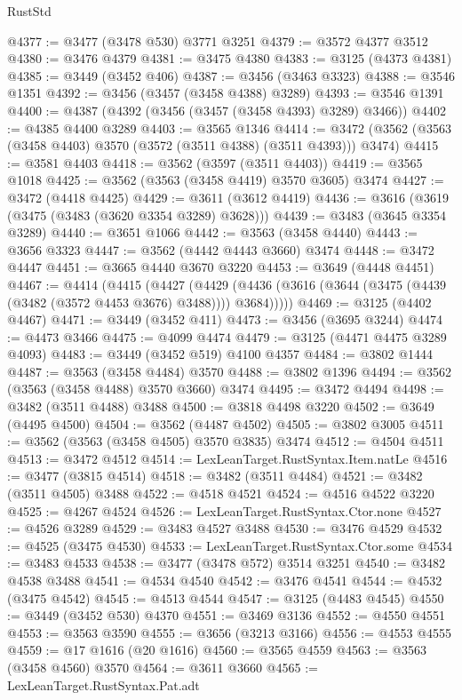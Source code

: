 \begin{lexlean}{RustStd}
\begin{coremodule}
{\begin{coremodule}
{{{{{{{{{{{{{{{{{{{{{{{{{{{{{{{{{{{{{{{{{{{{{@4377 := @3477 (@3478 @530) @3771 @3251
@4379 := @3572 @4377 @3512
@4380 := @3476 @4379
@4381 := @3475 @4380
@4383 := @3125 (@4373 @4381)
@4385 := @3449 (@3452 @406)
@4387 := @3456 (@3463 @3323)
@4388 := @3546 @1351
@4392 := @3456 (@3457 (@3458 @4388) @3289)
@4393 := @3546 @1391
@4400 := @4387 (@4392 (@3456 (@3457 (@3458 @4393) @3289) @3466))
@4402 := @4385 @4400 @3289
@4403 := @3565 @1346
@4414 := @3472 (@3562 (@3563 (@3458 @4403) @3570 (@3572 (@3511 @4388) (@3511 @4393))) @3474)
@4415 := @3581 @4403
@4418 := @3562 (@3597 (@3511 @4403))
@4419 := @3565 @1018
@4425 := @3562 (@3563 (@3458 @4419) @3570 @3605) @3474
@4427 := @3472 (@4418 @4425)
@4429 := @3611 (@3612 @4419)
@4436 := @3616 (@3619 (@3475 (@3483 (@3620 @3354 @3289) @3628)))
@4439 := @3483 (@3645 @3354 @3289)
@4440 := @3651 @1066
@4442 := @3563 (@3458 @4440)
@4443 := @3656 @3323
@4447 := @3562 (@4442 @4443 @3660) @3474
@4448 := @3472 @4447
@4451 := @3665 @4440 @3670 @3220
@4453 := @3649 (@4448 @4451)
@4467 := @4414
    (@4415
      (@4427
        (@4429 (@4436 (@3616 (@3644 (@3475 (@4439 (@3482 (@3572 @4453 @3676) @3488)))) @3684)))))
@4469 := @3125 (@4402 @4467)
@4471 := @3449 (@3452 @411)
@4473 := @3456 (@3695 @3244)
@4474 := @4473 @3466
@4475 := @4099 @4474
@4479 := @3125 (@4471 @4475 @3289 @4093)
@4483 := @3449 (@3452 @519) @4100 @4357
@4484 := @3802 @1444
@4487 := @3563 (@3458 @4484) @3570
@4488 := @3802 @1396
@4494 := @3562 (@3563 (@3458 @4488) @3570 @3660) @3474
@4495 := @3472 @4494
@4498 := @3482 (@3511 @4488) @3488
@4500 := @3818 @4498 @3220
@4502 := @3649 (@4495 @4500)
@4504 := @3562 (@4487 @4502)
@4505 := @3802 @3005
@4511 := @3562 (@3563 (@3458 @4505) @3570 @3835) @3474
@4512 := @4504 @4511
@4513 := @3472 @4512
@4514 := LexLeanTarget.RustSyntax.Item.natLe
@4516 := @3477 (@3815 @4514)
@4518 := @3482 (@3511 @4484)
@4521 := @3482 (@3511 @4505) @3488
@4522 := @4518 @4521
@4524 := @4516 @4522 @3220
@4525 := @4267 @4524
@4526 := LexLeanTarget.RustSyntax.Ctor.none
@4527 := @4526 @3289
@4529 := @3483 @4527 @3488
@4530 := @3476 @4529
@4532 := @4525 (@3475 @4530)
@4533 := LexLeanTarget.RustSyntax.Ctor.some
@4534 := @3483 @4533
@4538 := @3477 (@3478 @572) @3514 @3251
@4540 := @3482 @4538 @3488
@4541 := @4534 @4540
@4542 := @3476 @4541
@4544 := @4532 (@3475 @4542)
@4545 := @4513 @4544
@4547 := @3125 (@4483 @4545)
@4550 := @3449 (@3452 @530) @4370
@4551 := @3469 @3136
@4552 := @4550 @4551
@4553 := @3563 @3590
@4555 := @3656 (@3213 @3166)
@4556 := @4553 @4555
@4559 := @17 @1616 (@20 @1616)
@4560 := @3565 @4559
@4563 := @3563 (@3458 @4560) @3570
@4564 := @3611 @3660
@4565 := LexLeanTarget.RustSyntax.Pat.adt
}}}}}}}}}}}}}}}}}}}}}}}}}}}}}}}}}}}}}}}}}}}}}
\end{coremodule}}
\end{coremodule}
\end{lexlean}
